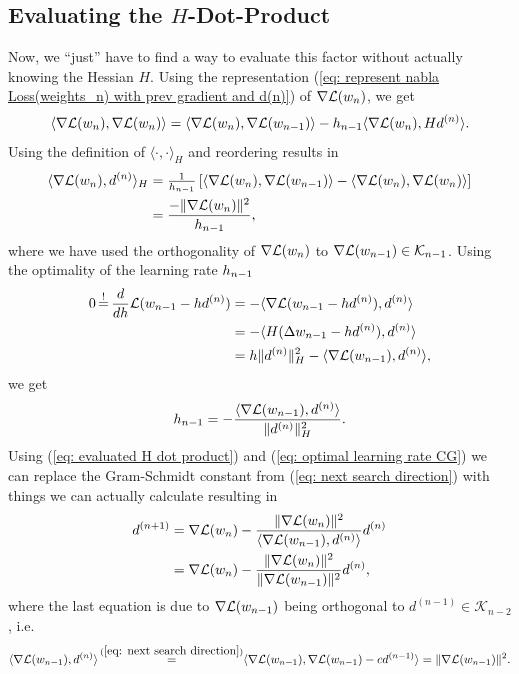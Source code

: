 \subsection{Evaluating the \(H\)-Dot-Product}

Now, we ``just'' have to find a way to evaluate this factor without actually
knowing the Hessian \(H\). Using the representation (\ref{eq: represent nabla Loss(weights_n) with
prev gradient and d(n)}) of \(\nabla\mathcal{L}(w_n)\), we get
\begin{align*}
	\langle \nabla\mathcal{L}(w_n), \nabla\mathcal{L}(w_n) \rangle
	= \langle \nabla\mathcal{L}(w_n), \nabla\mathcal{L}(w_{n-1}) \rangle
	- h_{n-1}\langle \nabla\mathcal{L}(w_n), H d^{(n)}\rangle.
\end{align*}
Using the definition of \(\langle\cdot,\cdot\rangle_H\) and reordering results in
\begin{align}
	\nonumber
	\langle \nabla\mathcal{L}(w_n), d^{(n)}\rangle_H
	&= \tfrac1{h_{n-1}}\left[
		\langle \nabla\mathcal{L}(w_n), \nabla\mathcal{L}(w_{n-1}) \rangle
		- \langle \nabla\mathcal{L}(w_n), \nabla\mathcal{L}(w_n) \rangle
	\right]\\
	\label{eq: evaluated H dot product}
	&= \frac{- \|\nabla\mathcal{L}(w_n)\|^2}{h_{n-1}},
\end{align}
where we have used the orthogonality of \(\nabla\mathcal{L}(w_n)\) to
\(\nabla\mathcal{L}(w_{n-1})\in\mathcal{K}_{n-1}\).
Using the optimality of the learning rate \(h_{n-1}\)
\begin{align*}
	0\xeq{!}\frac{d}{d\lr}\Loss(\weights_{n-1} - \lr d^{(n)})
	&= -\langle \nabla\Loss(\weights_{n-1} - \lr d^{(n)}), d^{(n)} \rangle\\
	&= -\langle H(\Delta\weights_{n-1} -\lr d^{(n)}), d^{(n)} \rangle\\
	&= \lr\|d^{(n)}\|_H^2 - \langle \nabla\Loss(\weights_{n-1}), d^{(n)}\rangle,
\end{align*}
we get
\begin{align}\label{eq: optimal learning rate CG}
	h_{n-1}
	= - \frac{\langle \nabla\mathcal{L}(w_{n-1}), d^{(n)}\rangle}{\|d^{(n)}\|_H^2}.
\end{align}
Using (\ref{eq: evaluated H dot product}) and (\ref{eq: optimal learning rate CG})
we can replace the Gram-Schmidt constant from (\ref{eq: next search direction})
with things we can actually calculate resulting in
\begin{align*}
	d^{(n+1)}
	&= \nabla\mathcal{L}(w_n)
	- \frac{
		\|\nabla\mathcal{L}(w_n)\|^2
	}{\langle \nabla\mathcal{L}(w_{n-1}), d^{(n)}\rangle}d^{(n)}\\
	&= \nabla\mathcal{L}(w_n)
	- \frac{\|\nabla\mathcal{L}(w_n)\|^2}{\|\nabla\mathcal{L}(w_{n-1})\|^2}
	d^{(n)},
\end{align*}
where the last equation is due to \(\nabla\mathcal{L}(w_{n-1})\) being orthogonal
to \(d^{(n-1)}\in\mathcal{K}_{n-2}\), i.e.
\begin{align*}
	\langle \nabla\Loss(\weights_{n-1}), d^{(n)} \rangle
	\xeq{(\ref{eq: next search direction})} 
	\langle \nabla\Loss(\weights_{n-1}),\nabla\Loss(\weights_{n-1}) - c d^{(n-1)}\rangle
	= \|\nabla\Loss(\weights_{n-1})\|^2.
\end{align*}

